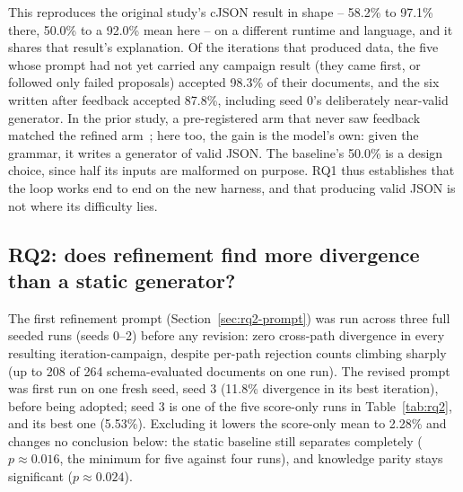 This reproduces the original study's cJSON result in shape -- 58.2\% to
97.1\% there, 50.0\% to a 92.0\% mean here -- on a different runtime and
language, and it shares that result's explanation. Of the iterations that
produced data, the five whose prompt had not yet carried any campaign result
(they came first, or followed only failed proposals) accepted 98.3\% of
their documents, and the six written after feedback accepted 87.8\%,
including seed 0's deliberately near-valid generator. In the prior study, a
pre-registered arm that never saw feedback matched the refined
arm~\priorworkcite; here too, the gain is the model's own: given the
grammar, it writes a generator of valid JSON. The baseline's 50.0\% is a
design choice, since half its inputs are malformed on purpose. RQ1 thus
establishes that the loop works end to end on the new harness, and that
producing valid JSON is not where its difficulty lies.

\subsection{RQ2: does refinement find more divergence than a static generator?}
\label{sec:evaluation-rq2}
The first refinement prompt (Section~\ref{sec:rq2-prompt}) was run across
three full seeded runs (seeds 0--2) before any revision: zero cross-path
divergence in every resulting iteration-campaign, despite per-path rejection
counts climbing sharply (up to 208 of 264 schema-evaluated documents on one
run). The revised prompt was first run on one fresh seed, seed 3 (11.8\%
divergence in its best iteration), before being adopted; seed 3 is one of
the five score-only runs in Table~\ref{tab:rq2}, and its best one (5.53\%).
Excluding it lowers the score-only mean to 2.28\% and changes no
conclusion below: the static baseline still separates completely
($p \approx 0.016$, the minimum for five against four runs), and knowledge
parity stays significant ($p \approx 0.024$).

